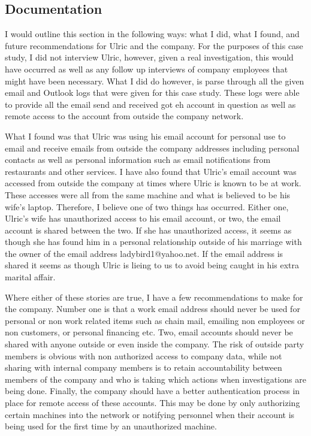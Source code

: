 \documentclass[paper=a4, fontsize=11pt]{scrartcl} %
\numberwithin{equation}{section} %
\numberwithin{figure}{section} %
\numberwithin{table}{section} %
\begin{document}
\subsection{Documentation}
I would outline this section in the following ways: what I did, what I found, and future
recommendations for Ulric and the company. For the purposes of this case study, I did not
interview Ulric, however, given a real investigation, this would have occurred as well as any
follow up interviews of company employees that might have been necessary. What I did do however,
is parse through all the given email and Outlook logs that were given for this case study. These
logs were able to provide all the email send and received got eh account in question as well as
remote access to the account from outside the company network. 

What I found was that Ulric was using his email account for personal use to email and receive
emails from outside the company addresses including personal contacts as well as personal
information such as email notifications from restaurants and other services. I have also found
that Ulric's email account was accessed from outside the company at times where Ulric is known
to be at work. These accesses were all from the same machine and what is believed to be
his wife's laptop. Therefore, I believe one of two things has occurred. Either one, Ulric's
wife has unauthorized access to his email account, or two, the email account is shared between
the two. If she has unauthorized access, it seems as though she has found him in a personal
relationship outside of his marriage with the owner of the email address ladybird1@yahoo.net.
If the email address is shared it seems as though Ulric is lieing to us to avoid being caught
in his extra marital affair.

Where either of these stories are true, I have a few recommendations to make for the company.
Number one is that a work email address should never be used for personal or non work related
items such as chain mail, emailing non employees or non customers, or personal financing etc.
Two, email accounts should never be shared with anyone outside or even inside the company. The
risk of outside party members is obvious with non authorized access to company data, while not
sharing with internal company members is to retain accountability between members of the company
and who is taking which actions when investigations are being done. Finally, the company should
have a better authentication process in place for remote access of these accounts. This may
be done by only authorizing certain machines into the network or notifying personnel when their
account is being used for the first time by an unauthorized machine.
\end{document}
